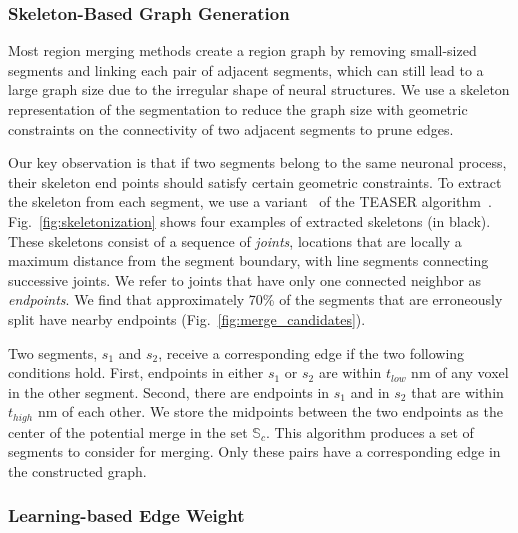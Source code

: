 \subsubsection{Skeleton-Based Graph Generation}
\label{sec:skeletonization}

Most region merging methods create a region graph by removing small-sized segments and linking each pair of adjacent segments, which can still lead to a large graph size due to the irregular shape of neural structures.
We use a skeleton representation of the segmentation to reduce the graph size with geometric constraints on the connectivity of two adjacent segments to prune edges.

Our key observation is that if two segments belong to the same neuronal process, their skeleton end points should satisfy certain geometric constraints.
To extract the skeleton from each segment, we use a variant~\cite{zhao2014automatic} of the TEASER algorithm~\cite{sato2000teasar}. 
Fig.~\ref{fig:skeletonization} shows four examples of extracted skeletons (in black). 
These skeletons consist of a sequence of \textit{joints}, locations that are locally a maximum distance from the segment boundary, with line segments connecting successive joints. 
We refer to joints that have only one connected neighbor as \textit{endpoints}. 
We find that approximately 70\% of the segments that are erroneously split have nearby endpoints (Fig.~\ref{fig:merge_candidates}). 

Two segments, $s_1$ and $s_2$, receive a corresponding edge if the two following conditions hold.
First, endpoints in either $s_1$ or $s_2$ are within $t_{low}$ nm of any voxel in the other segment.
Second, there are endpoints in $s_1$ and in $s_2$ that are within $t_{high}$ nm of each other.
We store the midpoints between the two endpoints as the center of the potential merge in the set $\mathbb{S}_c$. 
This algorithm produces a set of segments to consider for merging. 
Only these pairs have a corresponding edge in the constructed graph.

\subsubsection{Learning-based Edge Weight}
\label{sec:edge-weights}

